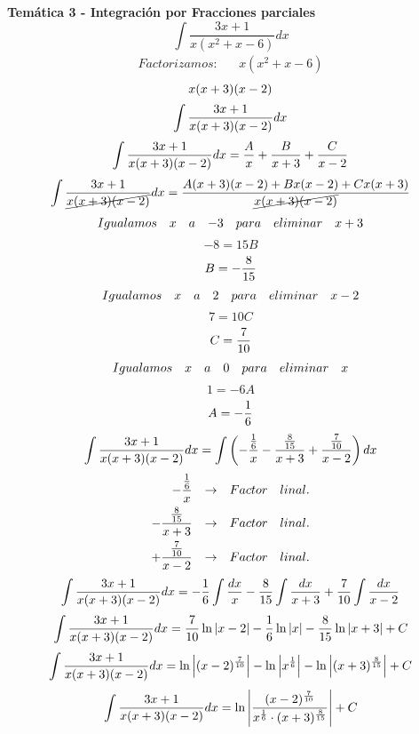 






\textbf{Temática 3 - Integración por Fracciones parciales}
\[\int\frac{3x+1}{x(x^2+x-6)}dx\]
\[
    \begin{aligned}
        Factorizamos: && x(x^2+x-6)
    \end{aligned}
\]
\[\drwdenominator{0}\]
\[\fracexpretion{0}\]
\[\fracexpretion{0}=\frac{A}{\fexpression}+\frac{B}{\sexpression}+\frac{C}{\texpression}\]
\[\fracexpretion{1}=\frac{A(\sexpression)(\texpression)+B\fexpression(\texpression)+C\fexpression(\sexpression)}{\drwdenominator{1}}\]
\[
    \begin{aligned}
        Igualamos && x && a && -3 && para && eliminar && x+3
    \end{aligned}
\]
\[-8=15B\]
\[B=\fracb{1}\]
\[
    \begin{aligned}
        Igualamos && x && a && 2 && para && eliminar && x-2
    \end{aligned}
\]
\[7=10C\]
\[C=\frac{7}{10}\]
\[
    \begin{aligned}
        Igualamos && x && a && 0 && para && eliminar && x
    \end{aligned}
\]
\[1=-6A\]
\[A=\fraca{1}\]
\[\fracexpretion{0}=\int\left(\drawffraction\drawsfraction\drawtfraction\right)dx\]
\[
    \begin{aligned}
       \drawffraction && \rightarrow && Factor && linal. \\
       \drawsfraction && \rightarrow && Factor && linal. \\
       \drawtfraction && \rightarrow && Factor && linal.
    \end{aligned}
\]
\[\fracexpretion{0}=\fraca{1}\int\frac{dx}{\fexpression}\fracb{1}\int\frac{dx}{\sexpression}+\fracc\int\frac{dx}{\texpression}\]
\[\fracexpretion{0}=\fracc\ln\left|\texpression\right|\fraca{1}\ln\left|\fexpression\right|\fracb{1}\ln\left|\sexpression\right|+C\]
\[\fracexpretion{0}=\ln\left|\drawtexpression\right|-\ln\left|\drawfexpression\right|-\ln\left|\drawsexpression\right|+C\]
\[\fracexpretion{0}=\ln\left|\frac{\drawtexpression}{\drawfexpression\cdot\drawsexpression}\right|+C\]